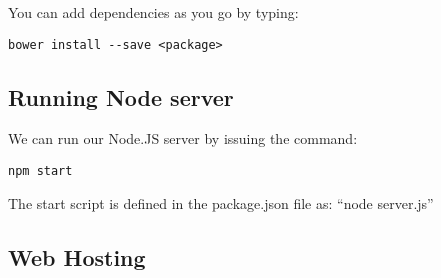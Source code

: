 \documentclass[twocolumn]{article}
\begin{document}
You can add dependencies as you go by typing:
\begin{lstlisting}
bower install --save <package>
\end{lstlisting}

\subsection{Running Node server}
We can run our Node.JS server by issuing the command:
\begin{lstlisting}
npm start
\end{lstlisting}
The start script is defined in the package.json file as: ``node server.js''

\subsection{Web Hosting}
\end{document}
